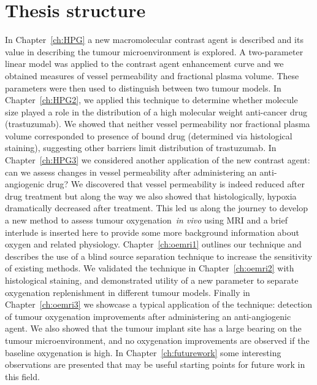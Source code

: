\section{Thesis structure}

In Chapter~\ref{ch:HPG} a new macromolecular contrast agent is described and its value in describing the tumour microenvironment is explored.
A two-parameter linear model was applied to the contrast agent enhancement curve and we obtained measures of vessel permeability and fractional plasma volume.
These parameters were then used to distinguish between two tumour models.
In Chapter~\ref{ch:HPG2}, we applied this technique to determine whether molecule size played a role in the distribution of a high molecular weight anti-cancer drug (trastuzumab).
We showed that neither vessel permeability nor fractional plasma volume corresponded to presence of bound drug (determined via histological staining), suggesting other barriers limit distribution of trastuzumab.
In Chapter~\ref{ch:HPG3} we considered another application of the new contrast agent: can we assess changes in vessel permeability after administering an anti-angiogenic drug?
We discovered that vessel permeability is indeed reduced after drug treatment but along the way we also showed that histologically, hypoxia dramatically decreased after treatment. 
This led us along the journey to develop a new method to assess tumour oxygenation~\emph{in vivo} using MRI and a brief interlude is inserted here to provide some more background information about oxygen and related physiology.
Chapter~\ref{ch:oemri1} outlines our technique and describes the use of a blind source separation technique to increase the sensitivity of existing methods. 
We validated the technique in Chapter~\ref{ch:oemri2} with histological staining, and demonstrated utility of a new parameter to separate oxygenation replenishment in different tumour models.
Finally in Chapter~\ref{ch:oemri3} we showcase a typical application of the technique: detection of tumour oxygenation improvements after administering an anti-angiogenic agent. 
We also showed that the tumour implant site has a large bearing on the tumour microenvironment, and no oxygenation improvements are observed if the baseline oxygenation is high.
In Chapter~\ref{ch:futurework} some interesting observations are presented that may be useful starting points for future work in this field.